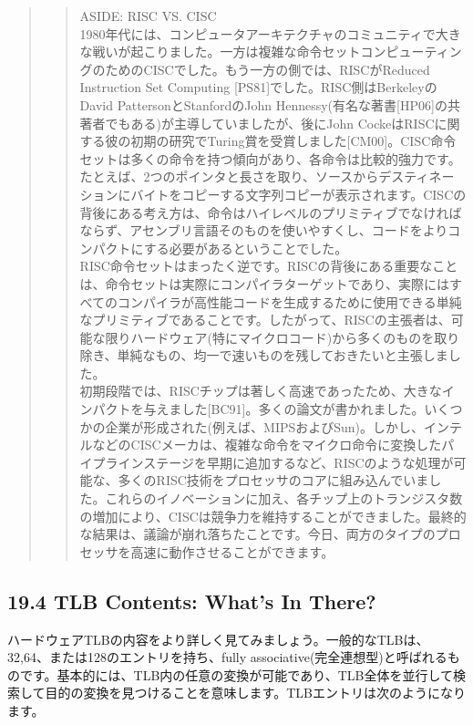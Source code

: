 \begin{quote}
\begin{quote}
ASIDE: RISC VS. CISC\\
1980年代には、コンピュータアーキテクチャのコミュニティで大きな戦いが起こりました。一方は複雑な命令セットコンピューティングのためのCISCでした。もう一方の側では、RISCがReduced
Instruction Set Computing {[}PS81{]}でした。RISC側はBerkeleyのDavid
PattersonとStanfordのJohn
Hennessy(有名な著書{[}HP06{]}の共著者でもある)が主導していましたが、後にJohn
CockeはRISCに関する彼の初期の研究でTuring賞を受賞しました{[}CM00{]}。CISC命令セットは多くの命令を持つ傾向があり、各命令は比較的強力です。たとえば、2つのポインタと長さを取り、ソースからデスティネーションにバイトをコピーする文字列コピーが表示されます。CISCの背後にある考え方は、命令はハイレベルのプリミティブでなければならず、アセンブリ言語そのものを使いやすくし、コードをよりコンパクトにする必要があるということでした。\\
RISC命令セットはまったく逆です。RISCの背後にある重要なことは、命令セットは実際にコンパイラターゲットであり、実際にはすべてのコンパイラが高性能コードを生成するために使用できる単純なプリミティブであることです。したがって、RISCの主張者は、可能な限りハードウェア(特にマイクロコード)から多くのものを取り除き、単純なもの、均一で速いものを残しておきたいと主張しました。\\
初期段階では、RISCチップは著しく高速であったため、大きなインパクトを与えました{[}BC91{]}。多くの論文が書かれました。いくつかの企業が形成された(例えば、MIPSおよびSun)。しかし、インテルなどのCISCメーカは、複雑な命令をマイクロ命令に変換したパイプラインステージを早期に追加するなど、RISCのような処理が可能な、多くのRISC技術をプロセッサのコアに組み込んでいました。これらのイノベーションに加え、各チップ上のトランジスタ数の増加により、CISCは競争力を維持することができました。最終的な結果は、議論が崩れ落ちたことです。今日、両方のタイプのプロセッサを高速に動作させることができます。
\end{quote}
\end{quote}

\hypertarget{tlb-contents-whats-in-there}{%
\subsection*{19.4 TLB Contents: What's In
There?}\label{tlb-contents-whats-in-there}}

ハードウェアTLBの内容をより詳しく見てみましょう。一般的なTLBは、32,64、または128のエントリを持ち、fully
associative(完全連想型)と呼ばれるものです。基本的には、TLB内の任意の変換が可能であり、TLB全体を並行して検索して目的の変換を見つけることを意味します。TLBエントリは次のようになります。

